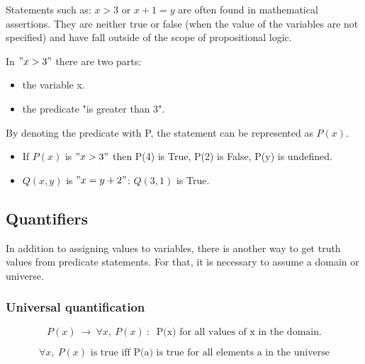 \documentclass[12pt, a4paper]{book}
\begin{document}
Statements such as: $x>3$ or $x+1=y$ are often found in mathematical assertions. They are neither true or false (when the value of the variables are not specified) and have fall outside of the scope of propositional logic.

In $"x>3"$ there are two parts:
\begin{itemize}
    \item the variable x.
    \item the predicate "is greater than 3".
\end{itemize}

By denoting the predicate with P, the statement can be represented as $P(x)$.

\begin{exmp}
    \begin{itemize}
        \item If $P(x)$ is $"x>3"$ then P(4) is True, P(2) is False, P(y) is undefined.
        \item $Q(x,y)$ is $"x=y+2"$: $Q(3,1)$ is True.
    \end{itemize}
\end{exmp}

\subsection*{Quantifiers}

In addition to assigning values to variables, there is another way to get truth values from predicate statements. For that, it is necessary to assume a domain or universe.

\subsubsection*{Universal quantification}

$$P(x) \ \rightarrow \ \forall x, \ P(x) \ : \ \text{ P(x) for all values of x in the domain}.$$

$$\forall x, \ P(x) \text{ is true iff P(a) is true for all elements a in the universe}$$
\end{document}
